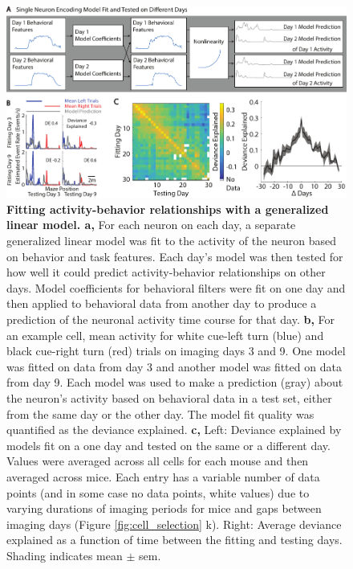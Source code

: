 \begin{figure}
\includegraphics[width=\textwidth]{figures/4_glm_across_design.pdf}
\caption[Fitting activity-behavior relationships with a generalized linear model.]{\textbf{Fitting activity-behavior relationships with a generalized linear model. a,} For each neuron on each day, a separate generalized linear model was fit to the activity of the neuron based on behavior and task features. Each day's model was then tested for how well it could predict activity-behavior relationships on other days. Model coefficients for behavioral filters were fit on one day and then applied to behavioral data from another day to produce a prediction of the neuronal activity time course for that day.
%
\textbf{b,} For an example cell, mean activity for white cue-left turn (blue) and black cue-right turn (red) trials on imaging days 3 and 9. One model was fitted on data from day 3 and another model was fitted on data from day 9. Each model was used to make a prediction (gray) about the neuron's activity based on behavioral data in a test set, either from the same day or the other day. The model fit quality was quantified as the deviance explained. 
%
\textbf{c,} Left: Deviance explained by models fit on a one day and tested on the same or a different day. Values were averaged across all cells for each mouse and then averaged across mice. Each entry has a variable number of data points (and in some case no data points, white values) due to varying durations of imaging periods for mice and gaps between imaging days (Figure \ref{fig:cell_selection} k). Right: Average deviance explained as a function of time between the fitting and testing days. Shading indicates mean $\pm$ sem.
\label{fig:glm_across}}
\end{figure}

